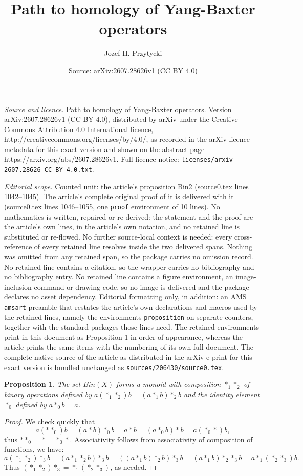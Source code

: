 \documentclass[10pt,a4paper]{amsart}
\title{Path to homology of Yang-Baxter operators}
\author{Jozef H. Przytycki}
\date{Source: arXiv:2607.28626v1 (CC BY 4.0)}
\newtheorem{proposition}{Proposition}
\begin{document}
\maketitle

\noindent\emph{Source and licence.} Path to homology of Yang-Baxter operators. Version arXiv:2607.28626v1 (CC BY 4.0), distributed by arXiv under the Creative Commons Attribution 4.0 International licence, http://creativecommons.org/licenses/by/4.0/, as recorded in the arXiv licence metadata for this exact version and shown on the abstract page https://arxiv.org/abs/2607.28626v1. Full licence notice: \texttt{licenses/arxiv-2607.28626-CC-BY-4.0.txt}.\par\smallskip

\noindent\textit{Editorial scope.} Counted unit: the article's proposition Bin2 (source0.tex lines 1042--1045). The article's complete original proof of it is delivered with it (source0.tex lines 1046--1055, one \texttt{proof} environment of 10 lines). No mathematics is written, repaired or re-derived: the statement and the proof are the article's own lines, in the article's own notation, and no retained line is substituted or re-flowed.  No further source-local context is needed: every cross-reference of every retained line resolves inside the two delivered spans.  Nothing was omitted from any retained span, so the package carries no omission record.  No retained line contains a citation, so the wrapper carries no bibliography and no bibliography entry.  No retained line contains a figure environment, an image-inclusion command or drawing code, so no image is delivered and the package declares no asset dependency.  Editorial formatting only, in addition: an AMS \texttt{amsart} preamble that restates the article's own declarations and macros used by the retained lines, namely the environments \texttt{proposition} on separate counters, together with the standard packages those lines need.  The retained environments print in this document as Proposition 1 in order of appearance, whereas the article prints the same items with the numbering of its own full document.  The complete native source of the article as distributed in the arXiv e-print for this exact version is bundled unchanged as \texttt{sources/206430/source0.tex}.
\begin{proposition}\label{Bin2}
The set $Bin(X)$ forms a monoid with composition $*_1*_2$ of binary operations defined by $a(*_1*_2)b= (a*_1b)*_2b$ and the identity element 
$*_0$ defined by $a*_0b=a$.
\end{proposition}

\begin{proof} We check quickly that 
\begin{equation*}
a(**_0)b= (a*b)*_0b=a*b= (a*_0b)*b=a(*_0*)b,
\end{equation*}
thus $**_0=*=*_0*$. Associativity follows from associativity of composition of functions, we have:
\begin{equation*}
a(*_1*_2)*_3b=(a*_1*_2b)*_3b=((a*_1b)*_2b)*_3b=(a*_1b)*_2*_3b=a*_1(*_2*_3)b.  
\end{equation*}
Thus $(*_1*_2)*_3= *_1(*_2*_3)$, as needed.
\end{proof}
\end{document}
